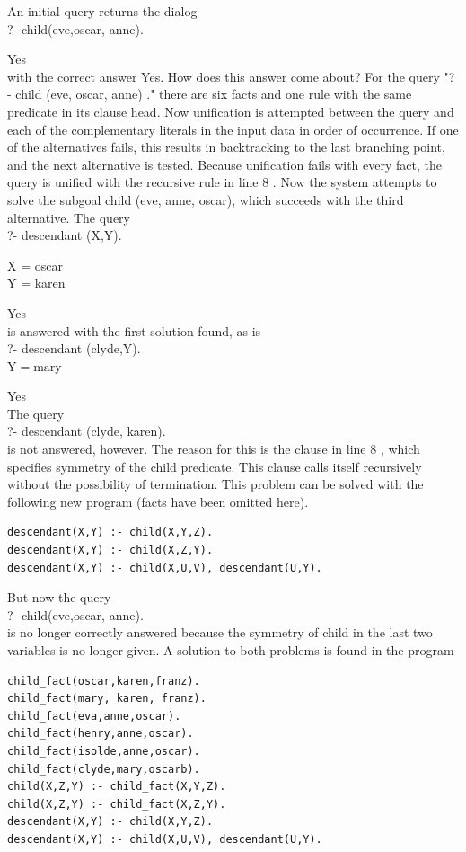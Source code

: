 \documentclass[10pt]{book}
\begin{document}
An initial query returns the dialog\\
?- child(eve,oscar, anne).

Yes\\
with the correct answer Yes. How does this answer come about? For the query "? - child (eve, oscar, anne) ." there are six facts and one rule with the same predicate in its clause head. Now unification is attempted between the query and each of the complementary literals in the input data in order of occurrence. If one of the alternatives fails, this results in backtracking to the last branching point, and the next alternative is tested. Because unification fails with every fact, the query is unified with the recursive rule in line 8 . Now the system attempts to solve the subgoal child (eve, anne, oscar), which succeeds with the third alternative. The query\\
?- descendant (X,Y).

X = oscar\\
Y = karen

Yes\\
is answered with the first solution found, as is\\
?- descendant (clyde,Y).\\
$\mathrm{Y}=\mathrm{mar} \mathrm{y}$

Yes\\
The query\\
?- descendant (clyde, karen).\\
is not answered, however. The reason for this is the clause in line 8 , which specifies symmetry of the child predicate. This clause calls itself recursively without the possibility of termination. This problem can be solved with the following new program (facts have been omitted here).

\begin{verbatim}
descendant(X,Y) :- child(X,Y,Z).
descendant(X,Y) :- child(X,Z,Y).
descendant(X,Y) :- child(X,U,V), descendant(U,Y).
\end{verbatim}

But now the query\\
?- child(eve,oscar, anne).\\
is no longer correctly answered because the symmetry of child in the last two variables is no longer given. A solution to both problems is found in the program

\begin{verbatim}
child_fact(oscar,karen,franz).
child_fact(mary, karen, franz).
child_fact(eva,anne,oscar).
child_fact(henry,anne,oscar).
child_fact(isolde,anne,oscar).
child_fact(clyde,mary,oscarb).
child(X,Z,Y) :- child_fact(X,Y,Z).
child(X,Z,Y) :- child_fact(X,Z,Y).
descendant(X,Y) :- child(X,Y,Z).
descendant(X,Y) :- child(X,U,V), descendant(U,Y).
\end{verbatim}
\end{document}

